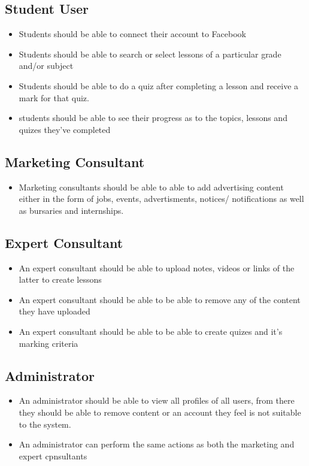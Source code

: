 \documentclass[10pt]{article}
\begin{document}
\subsection*{Student User}
\begin{itemize}
\item Students should be able to connect their account to Facebook
\item Students should be able to search or select lessons of a particular grade and/or subject
\item Students should be able to do a quiz after completing a lesson and receive a mark for that quiz.
\item students should be able to see their progress as to the topics, lessons and quizes they've completed
\end{itemize}

\subsection*{Marketing Consultant}
\begin{itemize}
\item Marketing consultants should be able to able to add advertising content either in the form of jobs, events, advertisments, notices/ notifications as well as bursaries and internships.
\end{itemize}

\subsection*{Expert Consultant}
\begin{itemize}
\item An expert consultant should be able to upload notes, videos or links of the latter to create lessons
\item An expert consultant should be able to be able to  remove any of the content they have uploaded
\item An expert consultant should be able to be able to create quizes and it's marking criteria
\end{itemize}

\subsection*{Administrator}
\begin{itemize}
\item An administrator should be able to view all profiles of all users, from there they should be able to remove content or an account they feel is not suitable to the system.
\item An administrator can perform the same actions as both the marketing and expert cpnsultants
\end{itemize}
\end{document}
